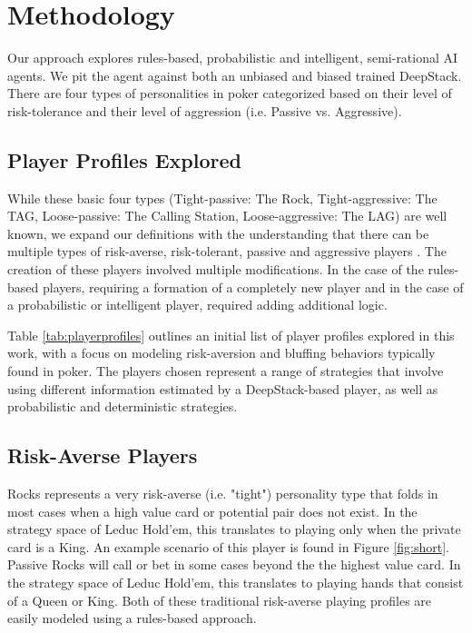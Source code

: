 \documentclass{article}
\begin{document}
\section{Methodology}
Our approach explores rules-based, probabilistic and intelligent, semi-rational AI agents. We pit the agent against both an unbiased and biased trained DeepStack. There are four types of personalities in poker categorized based on their level of risk-tolerance and their level of aggression (i.e. Passive vs. Aggressive).

\subsection{Player Profiles Explored}
\indent While these basic four types (Tight-passive: The Rock, Tight-aggressive: The TAG, Loose-passive: The Calling Station, Loose-aggressive: The LAG) are well known, we expand our definitions with the understanding that there can be multiple types of risk-averse, risk-tolerant, passive and aggressive players \cite{teafilo}. The creation of these players involved multiple modifications. In the case of the rules-based players, requiring a formation of a completely new player 
and in the case of a probabilistic or intelligent player, required adding additional logic.

\indent Table \ref{tab:playerprofiles} outlines an initial list of player profiles explored in this work, with a focus on modeling risk-aversion and bluffing behaviors typically found in poker.  The players chosen represent a range of strategies that involve using different information estimated by a DeepStack-based player, as well as probabilistic and deterministic strategies.

\subsection{Risk-Averse Players}
Rocks represents a very risk-averse (i.e. "tight") personality type that folds in most cases when a high value card or potential pair does not exist. In the strategy space of Leduc Hold'em, this translates to playing only when the private card is a King. An example scenario of this player is found in Figure \ref{fig:short}. Passive Rocks will call or bet in some cases beyond the the highest value card. In the strategy space of Leduc Hold'em, this translates to playing hands that consist of a Queen or King. Both of these traditional risk-averse playing profiles are easily modeled using a rules-based approach.
\end{document}
